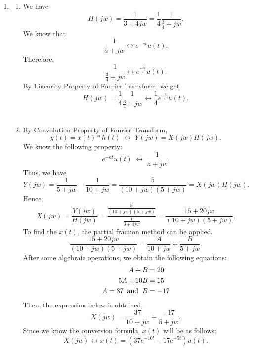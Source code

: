 \documentclass[10pt,a4paper, margin=1in]{article}
\begin{document}
\begin{enumerate}
\newpage
    
\item %
    \begin{enumerate}
    \item %
    We have
    $$H(jw) = \frac{1}{3+4jw} = \frac{1}{4}\frac{1}{\frac{3}{4}+jw}.$$
    We know that
    $$\frac{1}{a+jw} \leftrightarrow e^{-at}u(t).$$
    Therefore,
    $$\frac{1}{\frac{3}{4}+jw} \leftrightarrow e^{\frac{-3t}{4}}u(t).$$
    By Linearity Property of Fourier Transform, we get
    $$H(jw) = \frac{1}{4}\frac{1}{\frac{3}{4}+jw} \leftrightarrow \frac{1}{4}e^{\frac{-3t}{4}}u(t).$$\vspace{0.3cm}\\
    
    \item %
    By Convolution Property of Fourier Transform,
    $$y(t) = x(t) \ast h(t) \; \leftrightarrow \; Y(jw) = X(jw)H(jw).$$
    We know the following property:
    $$e^{-at}u(t) \; \leftrightarrow \; \frac{1}{a+jw}.$$
    Thus, we have
    $$Y(jw) = \frac{1}{5+jw}-\frac{1}{10+jw} = \frac{5}{(10+jw)(5+jw)} = X(jw)H(jw).$$
    Hence,
    $$X(jw) = \frac{Y(jw)}{H(jw)} = \frac{\frac{5}{(10+jw)(5+jw)}}{\frac{1}{3+4jw}} = \frac{15+20jw}{(10+jw)(5+jw)}.$$
    To find the $x(t)$, the partial fraction method can be applied.
    $$\frac{15+20jw}{(10+jw)(5+jw)}=\frac{A}{10+jw}+\frac{B}{5+jw}.$$
    After some algebraic operations, we obtain the following equations:
    \begin{align*}
        A+B&=20\\
        5A+10B&=15\\
        A=37 \hspace{0.2cm} \text{and} \hspace{0.2cm} B&=-17
    \end{align*}
    Then, the expression below is obtained,
    $$X(jw)=\frac{37}{10+jw}+\frac{-17}{5+jw}.$$
    Since we know the conversion formula, $x(t)$ will be as follows:
    $$X(jw)\leftrightarrow x(t)=(37e^{-10t}-17e^{-5t})u(t).$$
    \end{enumerate}
    

\end{enumerate}
\end{document}

